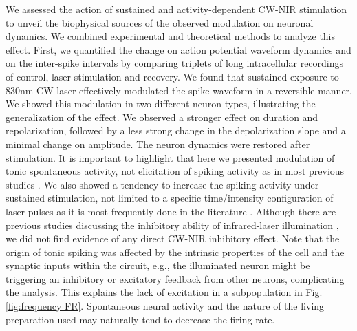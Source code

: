 We assessed the action of sustained and activity-dependent CW-NIR stimulation to unveil the biophysical sources of the observed modulation on neuronal dynamics. We combined experimental and theoretical methods to analyze this effect. First, we quantified the change on action potential waveform dynamics and on the inter-spike intervals by comparing triplets of long intracellular recordings of control, laser stimulation and recovery. We found that sustained exposure to 830nm CW laser effectively modulated the spike waveform in a reversible manner. We showed this modulation in two different neuron types, illustrating the generalization of the effect. We observed a stronger effect on duration and repolarization, followed by a less strong change in the depolarization slope and a minimal change on amplitude. The neuron dynamics were restored after stimulation. It is important to highlight that here we presented modulation of tonic spontaneous activity, not elicitation of spiking activity as in most previous studies \parencite{wells_application_2005,izzo_optical_2007,shapiro_infrared_2012,rabbitt_heat_2016}. We also showed a tendency to increase the spiking activity under sustained stimulation, not limited to a specific time/intensity configuration of laser pulses as it is most frequently done in the literature \parencite{izzo_optical_2007,goyal_acute_2012,beier_plasma_2014,pan_infrared_2023}. Although there are previous studies discussing the inhibitory ability of infrared-laser illumination \parencite{duke_transient_2013,lothet_selective_2017,ganguly_thermal_2019, begeng_activity_2022}, we did not find evidence of any direct CW-NIR inhibitory effect. Note that the origin of tonic spiking was affected by the intrinsic properties of the cell and the synaptic inputs within the circuit, e.g., the illuminated neuron might be triggering an inhibitory or excitatory feedback from other neurons, complicating the analysis. This explains the lack of excitation in a subpopulation in Fig. \ref{fig:frequency FR}. Spontaneous neural activity and the nature of the living preparation used may naturally tend to decrease the firing rate.

